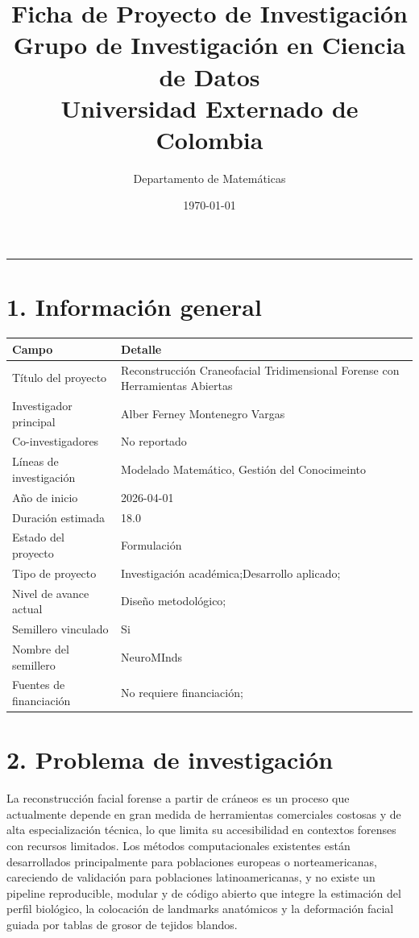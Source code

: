 \documentclass[a4paper,12pt]{article}
\title{
\vspace{-8mm}
\textbf{\textcolor{ExternadoGreen}{Ficha de Proyecto de Investigación}}\\
\large \textcolor{ExternadoDark}{Grupo de Investigación en Ciencia de Datos}\\
\large \textcolor{ExternadoDark}{Universidad Externado de Colombia}
}
\author{\textcolor{ExternadoDark}{Departamento de Matemáticas}}
\date{\textcolor{ExternadoDark}{\today}}
\begin{document}
\maketitle
\vspace{-3mm}
\noindent\textcolor{ExternadoDark}{\rule{\textwidth}{0.6pt}}

\section*{1. Información general}
\begin{longtable}{p{4.2cm} p{10.4cm}}
\toprule
\textbf{Campo} & \textbf{Detalle} \\
\midrule
Título del proyecto & Reconstrucción Craneofacial Tridimensional Forense con Herramientas Abiertas \\
Investigador principal & Alber Ferney Montenegro Vargas \\
Co-investigadores & No reportado \\
Líneas de investigación & Modelado Matemático, Gestión del Conocimeinto \\
Año de inicio & 2026-04-01 \\
Duración estimada & 18.0 \\
Estado del proyecto & Formulación \\
Tipo de proyecto & Investigación académica;Desarrollo aplicado; \\
Nivel de avance actual & Diseño metodológico; \\
Semillero vinculado & Si \\
Nombre del semillero & NeuroMInds \\
Fuentes de financiación & No requiere financiación; \\
\bottomrule
\end{longtable}

\section*{2. Problema de investigación}
La reconstrucción facial forense a partir de cráneos es un proceso que actualmente depende en gran medida de herramientas comerciales costosas y de alta especialización técnica, lo que limita su accesibilidad en contextos forenses con recursos limitados. Los métodos computacionales existentes están desarrollados principalmente para poblaciones europeas o norteamericanas, careciendo de validación para poblaciones latinoamericanas, y no existe un pipeline reproducible, modular y de código abierto que integre la estimación del perfil biológico, la colocación de landmarks anatómicos y la deformación facial guiada por tablas de grosor de tejidos blandos.
\end{document}
